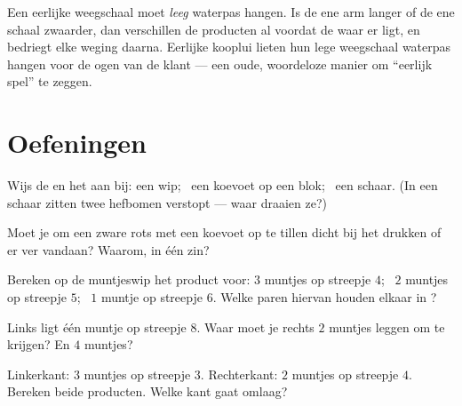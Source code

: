 \begin{remark}\label{rem:g3:levers-and-scales:fair}
Een eerlijke weegschaal moet \emph{leeg} waterpas hangen. Is de ene
arm langer of de ene schaal zwaarder, dan verschillen de producten al
voordat de waar er ligt, en bedriegt elke weging daarna. Eerlijke
kooplui lieten hun lege weegschaal waterpas hangen voor de ogen van de
klant --- een oude, woordeloze manier om ``eerlijk spel'' te zeggen.
\end{remark}

\section{Oefeningen}

\begin{exercise}[$\star$]\label{exo:g3:levers-and-scales:1}
Wijs de  en het  aan bij: een wip; \ een koevoet op
een blok; \ een schaar. (In een schaar zitten twee hefbomen
verstopt --- waar draaien ze?)
\end{exercise}

\begin{exercise}[$\star$]\label{exo:g3:levers-and-scales:2}
Moet je om een zware rots met een koevoet op te tillen dicht bij het
 drukken of er ver vandaan? Waarom, in één zin?
\end{exercise}

\begin{exercise}[$\star$]\label{exo:g3:levers-and-scales:3}
Bereken op de muntjeswip het product voor: $3$ muntjes op streepje
$4$; \ $2$ muntjes op streepje $5$; \ $1$ muntje op streepje $6$.
Welke paren hiervan houden elkaar in ?
\end{exercise}

\begin{exercise}[$\star$]\label{exo:g3:levers-and-scales:4}
Links ligt één muntje op streepje $8$. Waar moet je rechts $2$ muntjes
leggen om  te krijgen? En $4$ muntjes?
\end{exercise}

\begin{exercise}[$\star$]\label{exo:g3:levers-and-scales:5}
Linkerkant: $3$ muntjes op streepje $3$. Rechterkant: $2$ muntjes op
streepje $4$. Bereken beide producten. Welke kant gaat omlaag?
\end{exercise}

